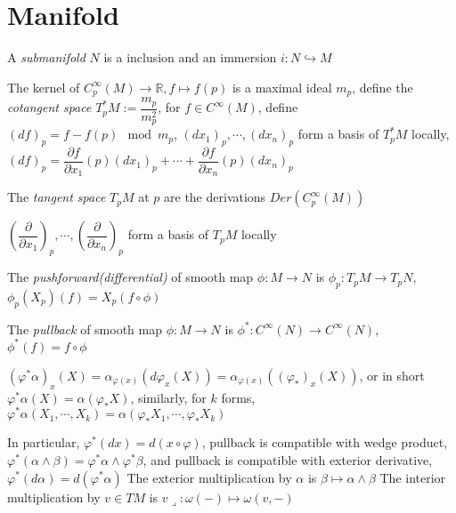 \documentclass[main]{subfiles}
\begin{document}
\tableofcontents
\newpage

\section{Manifold}

\begin{definition}
A \textit{submanifold} $N$ is a inclusion and an immersion $i:N\hookrightarrow M$
\end{definition}

\begin{definition}
The kernel of $C^\infty_p(M)\to\mathbb R, f\mapsto f(p)$ is a maximal ideal $m_p$, define the \textit{cotangent space} $T^*_pM:=\dfrac{m_p}{m_p^2}$, for $f\in C^\infty(M)$, define $(df)_p=f-f(p)\mod m_p$, $(dx_1)_p,\cdots,(dx_n)_p$ form a basis of $T^*_pM$ locally, $(df)_p=\dfrac{\partial f}{\partial x_1}(p)(dx_1)_p+\cdots+\dfrac{\partial f}{\partial x_n}(p)(dx_n)_p$
\end{definition}

\begin{definition}
The \textit{tangent space} $T_pM$ at $p$ are the derivations $Der(C^\infty_p(M))$ \par
$\left(\dfrac{\partial}{\partial x_1}\right)_p,\cdots,\left(\dfrac{\partial}{\partial x_n}\right)_p$ form a basis of $T_pM$ locally
\end{definition}

\begin{definition}
The \textit{pushforward(differential)} of smooth map $\phi:M\to N$ is $\phi_p:T_pM\to T_pN$, $\phi_p(X_p)(f)=X_p(f\circ\phi)$
\end{definition}

\begin{definition}
The \textit{pullback} of smooth map $\phi:M\to N$ is $\phi^*:C^\infty(N)\to C^\infty(N)$, $\phi^*(f)=f\circ\phi$
\end{definition}

\begin{definition}
$\left(\varphi^*\alpha\right)_x(X)=\alpha_{\varphi(x)}(d\varphi_x(X))=\alpha_{\varphi(x)}((\varphi_*)_x(X))$, or in short $\varphi^*\alpha(X)=\alpha(\varphi_*X)$, similarly, for $k$ forms, $\varphi^*\alpha(X_1,\cdots, X_k)=\alpha(\varphi_*X_1,\cdots,\varphi_*X_k)$ \par
In particular, $\varphi^*(dx)=d(x\circ\varphi)$, pullback is compatible with wedge product, $\varphi^*(\alpha\wedge\beta)=\varphi^*\alpha\wedge\varphi^*\beta$, and pullback is compatible with exterior derivative, $\varphi^*(d\alpha)=d(\varphi^*\alpha)$
The exterior multiplication by $\alpha$ is $\beta\mapsto\alpha\wedge\beta$
The interior multiplication by $v\in TM$ is $v\mathrel{\lrcorner}:\omega(-)\mapsto\omega(v,-)$
\end{definition}
\end{document}
